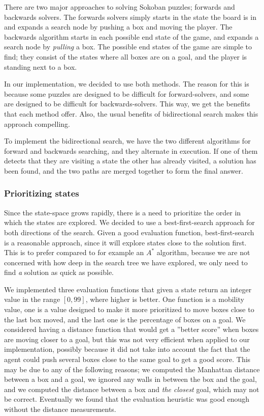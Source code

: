 \documentclass[a4paper,11pt]{article}
\begin{document}
There are two major approaches to solving Sokoban puzzles; forwards and backwards solvers.
The forwards solvers simply starts in the state the board is in and expands a search node
by pushing a box and moving the player.
The backwards algorithm starts in each possible end state of the game,
and expands a search node by \emph{pulling} a box.
The possible end states of the game are simple to find;
they consist of the states where all boxes are on a goal, and the player
is standing next to a box.

In our implementation, we decided to use both methods.
The reason for this is because some puzzles are designed to be difficult
for forward-solvers, and some are designed to be difficult for backwards-solvers.
This way, we get the benefits that each method offer.
Also, the usual benefits of bidirectional search makes this approach compelling.

To implement the bidirectional search, we have the two different algorithms
for forward and backwards searching, and they alternate in execution.
If one of them detects that they are visiting a state the other has already visited,
a solution has been found, and the two paths are merged together to form the final answer.

\subsubsection{Prioritizing states}
\label{sec:prio}

Since the state-space grows rapidly, there is a need to
prioritize the order in which the states are explored.
We decided to use a best-first-search approach for both directions of the search.
Given a good evaluation function, best-first-search is a reasonable
approach, since it will explore states close to the solution first.
This is to prefer compared to for example an $A^*$ algorithm,
because we are not concerned with how deep in the
search tree we have explored, we only need to find 
\emph{a} solution as quick as possible.

We implemented three evaluation functions that given a state return an integer value in the range
$[0, 99]$, where higher is better.
One function is a mobility value, one is a value designed to make
it more prioritized to move boxes close to the last box moved,
and the last one is the percentage of boxes on a goal.
We considered having a distance function that would get a ''better score''
when boxes are moving closer to a goal, but this was not very efficient
when applied to our implementation,
possibly because it did not take into account the fact that the agent could push several boxes
close to the same goal to get a good score.
This may be due to any of the following reasons;
	we computed the Manhattan distance between a box and a goal,
	we ignored any walls in between the box and the goal,
	and we computed the distance between a box and \emph{the closest} goal, which may not be correct.
Eventually we found that the evaluation heuristic was good enough without the distance measurements.
\end{document}
